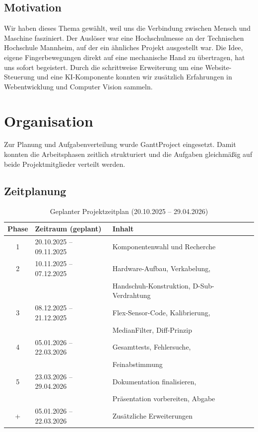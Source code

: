 \documentclass[12pt,a4paper]{article}
\begin{document}
\subsection{Motivation}
Wir haben dieses Thema gewählt, weil uns die Verbindung zwischen Mensch und 
Maschine fasziniert. Der Auslöser war eine Hochschulmesse an der Technischen 
Hochschule Mannheim, auf der ein ähnliches Projekt ausgestellt war. Die Idee, 
eigene Fingerbewegungen direkt auf eine mechanische Hand zu übertragen, hat uns 
sofort begeistert. Durch die schrittweise Erweiterung um eine Website-Steuerung 
und eine KI-Komponente konnten wir zusätzlich Erfahrungen in Webentwicklung 
und Computer Vision sammeln.

\newpage

\section{Organisation}
Zur Planung und Aufgabenverteilung wurde GanttProject eingesetzt. Damit konnten 
die Arbeitsphasen zeitlich strukturiert und die Aufgaben gleichmäßig auf beide 
Projektmitglieder verteilt werden.

\subsection{Zeitplanung}

\begin{table}[h]
\centering
\renewcommand{\arraystretch}{1.3}
\begin{tabular}{|c|l|l|}
\hline
\textbf{Phase} & \textbf{Zeitraum (geplant)} & \textbf{Inhalt} \\
\hline
1 & 20.10.2025 -- 09.11.2025 & Komponentenwahl und Recherche \\
\hline
2 & 10.11.2025 -- 07.12.2025 & Hardware-Aufbau, Verkabelung, \\
  &                           & Handschuh-Konstruktion, D-Sub-Verdrahtung \\
\hline
3 & 08.12.2025 -- 21.12.2025 & Flex-Sensor-Code, Kalibrierung, \\
  &                           & MedianFilter, Diff-Prinzip \\
\hline
4 & 05.01.2026 -- 22.03.2026 & Gesamttests, Fehlersuche, \\
  &                           & Feinabstimmung \\
\hline
5 & 23.03.2026 -- 29.04.2026 & Dokumentation finalisieren, \\
  &                           & Präsentation vorbereiten, Abgabe \\
\hline
+ & 05.01.2026 -- 22.03.2026 & Zusätzliche Erweiterungen\\
\hline
\end{tabular}
\caption{Geplanter Projektzeitplan (20.10.2025 -- 29.04.2026)}
\end{table}
\end{document}
